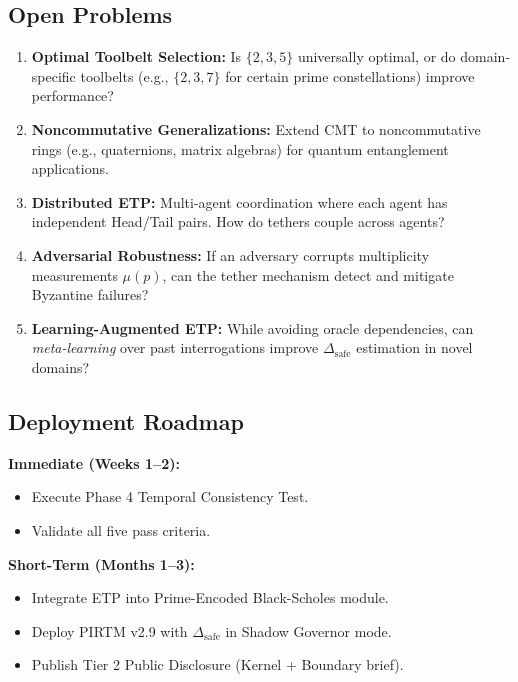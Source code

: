 \documentclass[12pt,a4paper]{article}
\begin{document}
\subsection{Open Problems}

\begin{enumerate}
\item \textbf{Optimal Toolbelt Selection:} Is $\{2, 3, 5\}$ universally optimal, or do domain-specific toolbelts (e.g., $\{2, 3, 7\}$ for certain prime constellations) improve performance?

\item \textbf{Noncommutative Generalizations:} Extend CMT to noncommutative rings (e.g., quaternions, matrix algebras) for quantum entanglement applications.

\item \textbf{Distributed ETP:} Multi-agent coordination where each agent has independent Head/Tail pairs. How do tethers couple across agents?

\item \textbf{Adversarial Robustness:} If an adversary corrupts multiplicity measurements $\mu(p)$, can the tether mechanism detect and mitigate Byzantine failures?

\item \textbf{Learning-Augmented ETP:} While avoiding oracle dependencies, can \textit{meta-learning} over past interrogations improve $\Delta_{\text{safe}}$ estimation in novel domains?
\end{enumerate}

\subsection{Deployment Roadmap}

\textbf{Immediate (Weeks 1--2):}
\begin{itemize}
\item Execute Phase 4 Temporal Consistency Test.
\item Validate all five pass criteria.
\end{itemize}

\textbf{Short-Term (Months 1--3):}
\begin{itemize}
\item Integrate ETP into Prime-Encoded Black-Scholes module.
\item Deploy PIRTM v2.9 with $\Delta_{\text{safe}}$ in Shadow Governor mode.
\item Publish Tier 2 Public Disclosure (Kernel + Boundary brief).
\end{itemize}
\end{document}
